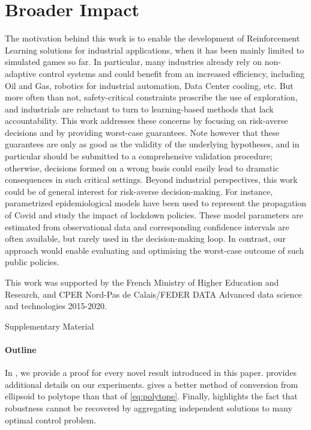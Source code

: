 \documentclass{article}
\begin{document}
\clearpage


\section*{Broader Impact}

The motivation behind this work is to enable the development of Reinforcement Learning solutions for industrial applications, when it has been mainly limited to simulated games so far. In particular, many industries already rely on non-adaptive control systems and could benefit from an increased efficiency, including Oil and Gas, robotics for industrial automation, Data Center cooling, etc. But more often than not, safety-critical constraints proscribe the use of exploration, and industrials are reluctant to turn to learning-based methods that lack accountability. This work addresses these concerns by focusing on risk-averse decisions and by providing worst-case guarantees. Note however that these guarantees are only as good as the validity of the underlying hypotheses, and  in particular should be submitted to a comprehensive validation procedure; otherwise, decisions formed on a wrong basis could easily lead to dramatic consequences in such critical settings.
Beyond industrial perspectives, this work could be of general interest for risk-averse decision-making. For instance, parametrized epidemiological models have been used to represent the propagation of Covid and study the impact of lockdown policies. These model parameters are estimated from observational data and corresponding confidence intervals are often available, but rarely used in the decision-making loop. In contrast, our approach would enable evaluating and optimising the worst-case outcome of such public policies.


\begin{ack}
	This work was supported by the French Ministry of Higher Education and Research, and CPER Nord-Pas de Calais/FEDER DATA Advanced data science and technologies 2015-2020.
\end{ack}




\clearpage
\onecolumn
\appendix

\begin{center}
	\LARGE Supplementary Material
\end{center}

\paragraph{Outline}
In , we provide a proof for every novel result introduced in this paper.  provides additional details on our experiments.  gives a better method of conversion from ellipsoid to polytope than that of \eqref{eq:polytope}. Finally,  highlights the fact that robustness cannot be recovered by aggregating independent solutions to many optimal control problem. 
\end{document}
